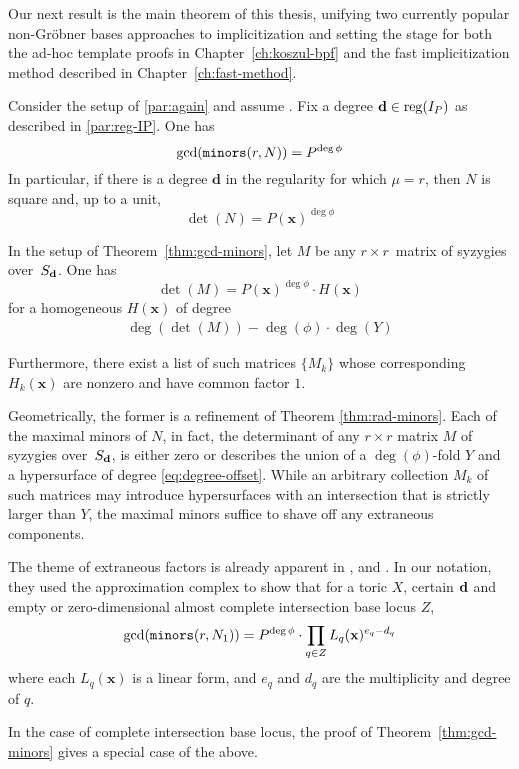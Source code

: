 \documentclass[fleqn,reqno]{amsart}
\begin{document}
\begin{paragraf*}
Our next result is the main theorem of this thesis, unifying two currently
popular non-Gr\"{o}bner bases approaches to implicitization and setting the stage for both
the ad-hoc template proofs in Chapter~\ref{ch:koszul-bpf} and
the fast implicitization method described in Chapter~\ref{ch:fast-method}.
\end{paragraf*}

\begin{theorem}
\label{thm:gcd-minors}
Consider the setup of \eqref{par:again} and assume .
Fix a degree $\mathbf d\in\operatorname{reg}(I_P)$ as described in \eqref{par:reg-IP}.
One has
\[
	\gcd(\mathop{\tt minors}(r, N))=P^{\deg\phi}
\]
In particular, if there is a degree $\mathbf d$ in the regularity for which $\mu=r$,
then $N$ is square and, up to a unit,
\[
	\det(N)=P(\mathbf x)^{\deg\phi}
\]
\end{theorem}

\begin{corollary}
\label{thm:detM}
In the setup of Theorem~\ref{thm:gcd-minors},
let $M$ be any $r\times r$~matrix of syzygies over~$S_\mathbf d$. One has
\[
	\det(M)=P(\mathbf x)^{\deg\phi}\cdot H(\mathbf x)
\]
for a homogeneous $H(\mathbf x)$ of degree
\begin{align}
\label{eq:degree-offset}
\deg(\det(M))-\deg(\phi)\cdot\deg(Y)
\end{align}

Furthermore, there exist a list of such matrices $\{M_k\}$ whose
corresponding $H_k(\mathbf x)$ are nonzero and have common factor $1$.
\end{corollary}

\begin{paragraf*}
Geometrically, the former is a refinement of Theorem \ref{thm:rad-minors}.
Each of the maximal minors of $N$, in fact,
the determinant of any $r\times r$ matrix $M$ of syzygies over~$S_\mathbf d$, is either zero
or describes the union of a $\deg(\phi)$-fold $Y$ and
a hypersurface of degree \eqref{eq:degree-offset}.
While an arbitrary collection $M_k$ of such matrices may introduce hypersurfaces
with an intersection that is strictly larger than $Y$,
the maximal minors suffice to shave off any extraneous components.

The theme of extraneous factors is already apparent in
\citet{BCD-03}, \citet{BCJ-09} and \citet{BDD-09}.
In our notation, they used the approximation complex to show that for a toric $X$,
certain $\mathbf d$ and empty or zero-dimensional almost complete intersection base locus $Z$,
\[
	\gcd(\mathop{\tt minors}(r,N_1))=P^{\deg\phi}\cdot\prod_{q\in Z} L_q(\mathbf x)^{e_q-d_q}
\]
where each $L_q(\mathbf x)$ is a linear form, and
$e_q$ and $d_q$ are the multiplicity and degree of $q$.

In the case of complete intersection base locus, the proof of Theorem~\ref{thm:gcd-minors}
gives a special case of the above.
\end{paragraf*}
\end{document}
